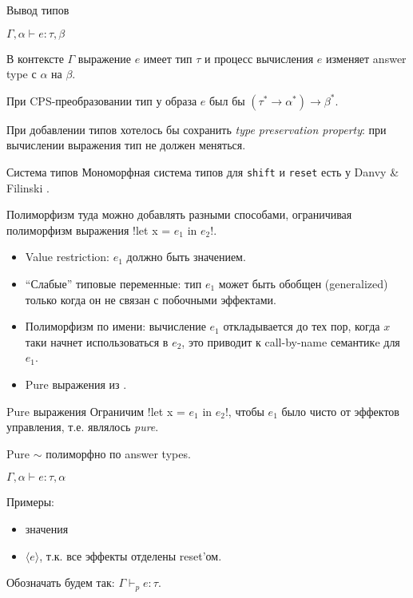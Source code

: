 \documentclass{beamer}
\begin{document}
\begin{frame}[fragile]{Вывод типов}

\begin{center}$\Gamma, \alpha \vdash e:\tau, \beta$\end{center}
В контексте $\Gamma$ выражение $e$ имеет тип $\tau$ и процесс вычисления $e$ изменяет answer type с $\alpha$ на $\beta$.\vspace{1cm}

При CPS-преобразовании тип у образа $e$ был бы $(\tau^* \rightarrow \alpha^*)\rightarrow \beta^*$. \vspace{1cm}

При добавлении типов хотелось бы сохранить \textit{type preservation property}: при вычислении выражения тип не должен меняться.
\end{frame}

\begin{frame}[fragile]{Система типов}
 Мономорфная система типов для \texttt{shift} и \texttt{reset} есть у Danvy \& Filinski \cite{Danvy89afunctional}. \vspace{0.5cm}
 
 Полиморфизм туда можно добавлять разными способами, ограничивая полиморфизм выражения \hsinline!let x = $e_1$ in $e_2$!.
 
 \begin{itemize}
  \item Value restriction: $e_1$ должно быть значением.
  \item ``Слабые'' типовые переменные: тип $e_1$ может быть обобщен (generalized) только когда он не связан с побочными эффектами.
  \item Полиморфизм по имени: вычисление $e_1$ откладывается до тех пор, когда $x$ таки начнет использоваться в $e_2$, это приводит к call-by-name семантикe для $e_1$.
  \item Pure выражения из \cite{asai2007} .
 \end{itemize}

\end{frame}

\begin{frame}[fragile]{Pure выражения}
Ограничим  \hsinline!let x = $e_1$ in $e_2$!, чтобы $e_1$ было чисто от эффектов управления, т.е. являлось \textit{pure}.\vspace{0.5cm}

Pure $\sim$ полиморфно по answer types.
\begin{center}$\Gamma, \alpha \vdash e:\tau, \alpha$\end{center}

Примеры:
\begin{itemize}
 \item значения
 \item $\langle e\rangle$, т.к. все эффекты отделены reset'ом.
\end{itemize}\vspace{0.5cm}

Обозначать будем так: $\Gamma \vdash_p e:\tau$.\vspace{0.5cm}

\end{frame}
\end{document}
